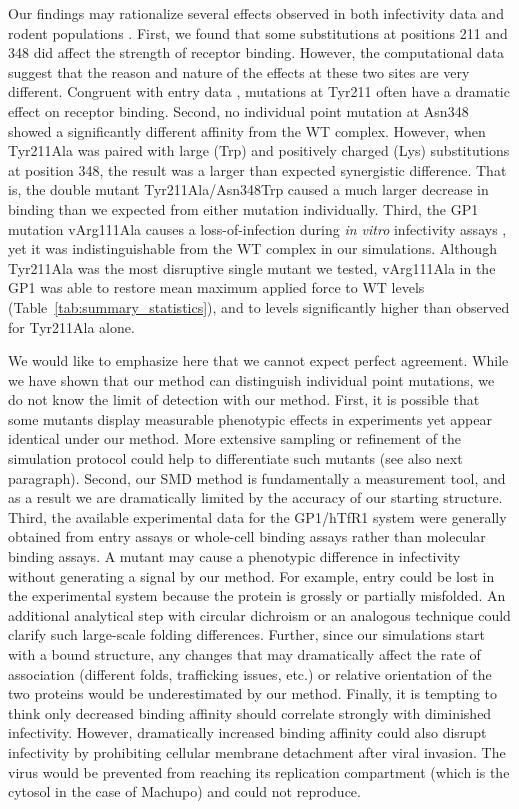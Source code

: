 \documentclass[12pt]{article}
\begin{document}
Our findings may rationalize several effects observed in both infectivity data and rodent populations \citep{Rad2008,Rad20111}. First, we found that some substitutions at positions 211 and 348 did affect the strength of receptor binding. However, the computational data suggest that the reason and nature of the effects at these two sites are very different. Congruent with entry data \citep{Rad2008,Rad20111}, mutations at Tyr211 often have a dramatic effect on receptor binding. Second, no individual point mutation at Asn348 showed a significantly different affinity from the WT complex. However, when Tyr211Ala was paired with large (Trp) and positively charged (Lys) substitutions at position 348, the result was a larger than expected synergistic difference. That is, the double mutant Tyr211Ala/Asn348Trp caused a much larger decrease in binding than we expected from either mutation individually. Third, the GP1 mutation vArg111Ala causes a loss-of-infection during \textit{in vitro} infectivity assays \citep{Rad20112}, yet it was indistinguishable from the WT complex in our simulations. Although Tyr211Ala was the most disruptive single mutant we tested, vArg111Ala in the GP1 was able to restore mean maximum applied force to WT levels (Table~\ref{tab:summary_statistics}), and to levels significantly higher than observed for Tyr211Ala alone.

We would like to emphasize here that we cannot expect perfect agreement. While we have shown that our method can distinguish individual point mutations, we do not know the limit of detection with our method. First, it is possible that some mutants display measurable phenotypic effects in experiments yet appear identical under our method. More extensive sampling or refinement of the simulation protocol could help to differentiate such mutants (see also next paragraph). Second, our SMD method is fundamentally a measurement tool, and as a result we are dramatically limited by the accuracy of our starting structure. Third, the available experimental data for the GP1/hTfR1 system were generally obtained from entry assays or whole-cell binding assays rather than molecular binding assays. A mutant may cause a phenotypic difference in infectivity without generating a signal by our method. For example, entry could be lost in the experimental system because the protein is grossly or partially misfolded. An additional analytical step with circular dichroism or an analogous technique could clarify such large-scale folding differences. Further, since our simulations start with a bound structure, any changes that may dramatically affect the rate of association (different folds, trafficking issues, etc.) or relative orientation of the two proteins would be underestimated by our method. Finally, it is tempting to think only decreased binding affinity should correlate strongly with diminished infectivity. However, dramatically increased binding affinity could also disrupt infectivity by prohibiting cellular membrane detachment after viral invasion. The virus would be prevented from reaching its replication compartment (which is the cytosol in the case of Machupo) and could not reproduce.
\end{document}
